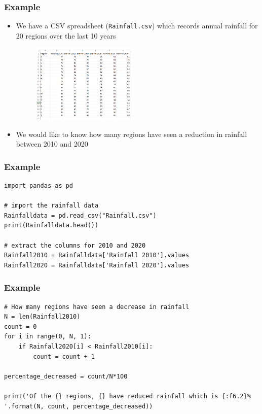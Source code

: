 \documentclass[english,14pt]{beamer}
\begin{document}

\begin{frame}[fragile]
\frametitle{Example}
\begin{itemize}
    \item We have a CSV spreadsheet (\texttt{Rainfall.csv}) which records annual rainfall for 20 regions over the last 10 years
    \begin{figure} 
        \centering
        \includegraphics[width=5cm]{figures/excel_rainfall.PNG}
        \label{fig:my_label}
    \end{figure}
    \item We would like to know how many regions have seen a reduction in rainfall between 2010 and 2020
\end{itemize}
\end{frame}


\begin{frame}[fragile]
\frametitle{Example}
\begin{lstlisting}[style=CStyle]
import pandas as pd

# import the rainfall data 
Rainfalldata = pd.read_csv("Rainfall.csv")
print(Rainfalldata.head())

# extract the columns for 2010 and 2020 
Rainfall2010 = Rainfalldata['Rainfall 2010'].values         
Rainfall2020 = Rainfalldata['Rainfall 2020'].values         

\end{lstlisting}
\end{frame}


\begin{frame}[fragile]
\frametitle{Example}
\begin{lstlisting}[style=CStyle]
# How many regions have seen a decrease in rainfall 
N = len(Rainfall2010)
count = 0
for i in range(0, N, 1):
    if Rainfall2020[i] < Rainfall2010[i]:
        count = count + 1

percentage_decreased = count/N*100

print('Of the {} regions, {} have reduced rainfall which is {:f6.2}% '.format(N, count, percentage_decreased))
\end{lstlisting}
\end{frame}
\end{document}
